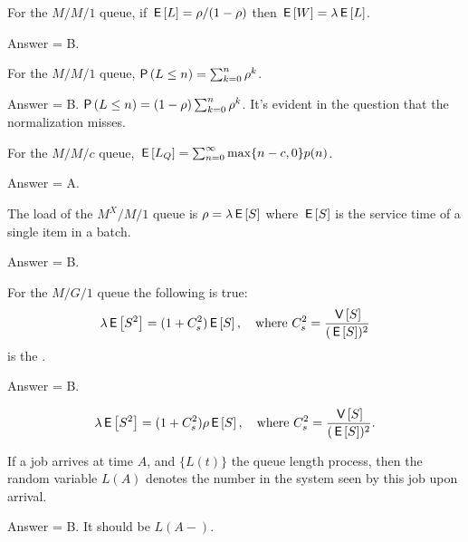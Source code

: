 \begin{exercise}[201803]
For the $M/M/1$ queue, if $\,\mathsf{E}\left[L\right] = \rho/(1-\rho)$ then $\,\mathsf{E}\left[W\right] = \lambda \,\mathsf{E}\left[L\right]$.
\begin{solution}
Answer = B.
\end{solution}
\end{exercise}

\begin{exercise}[201803]
For the $M/M/1$ queue, $\P{L\leq n} = \sum_{k=0}^n \rho^k$.
\begin{solution}
Answer = B. $\P{L\leq n} = (1-\rho)\sum_{k=0}^n \rho^k$. It's evident in the question that the normalization misses.
\end{solution}
\end{exercise}

\begin{exercise}[201803]
For the $M/M/c$ queue, $\,\mathsf{E}\left[L_Q\right] = \sum_{n=0}^\infty \max\{n-c, 0\} p(n)$. 
\begin{solution}
Answer = A.
\end{solution}
\end{exercise}

\begin{exercise}[201803]
The load of the $M^X/M/1$ queue is $\rho = \lambda \,\mathsf{E}\left[S\right]$ where $\,\mathsf{E}\left[S\right]$ is the service time of a single item in a batch.
\begin{solution}
Answer = B.
\end{solution}
\end{exercise}

\begin{exercise}[201803]
For the $M/G/1$ queue the following is true:
\begin{equation}
 \lambda \,\mathsf{E}\left[S^2\right] = (1+C_s^2)\,\mathsf{E}\left[S\right], \quad\text{where } C_s^2 = \frac{\,\mathsf{V}\left[S\right] }{(\,\mathsf{E}\left[S\right])^2}
\end{equation}
is the .
\begin{solution}
Answer = B.

\begin{equation}
 \lambda \,\mathsf{E}\left[S^2\right] = (1+C_s^2)\rho\,\mathsf{E}\left[S\right], \quad\text{where }
 C_s^2 = \frac{\,\mathsf{V}\left[S\right] }{(\,\mathsf{E}\left[S\right])^2}.
\end{equation}
\end{solution}
\end{exercise}

\begin{exercise}[201803]
If a job arrives at time $A$, and $\{L(t)\}$ the queue length process, then the random variable $L(A)$ denotes the number in the system seen by this job upon arrival.
\begin{solution}
Answer = B. It should be $L(A-)$.
\end{solution}
\end{exercise}

